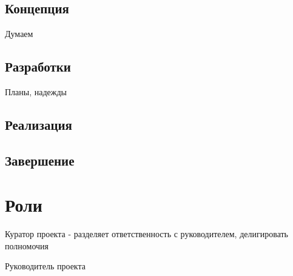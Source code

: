 \subsection{Концепция}
Думаем
\subsection{Разработки}
Планы, надежды
\subsection{Реализация}
\subsection{Завершение}

\section{Роли}

\begin{itemsize}
\item Куратор проекта - разделяет ответственность с руководителем, делигировать полномочия
\item Руководитель проекта
\end{itemsize}
